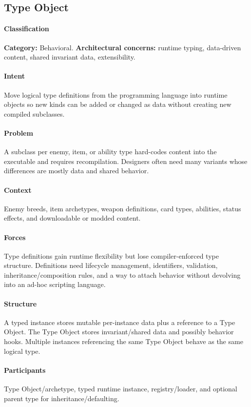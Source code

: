 \documentclass[11pt]{article}
\begin{document}
\subsection{Type Object}\label{pat:type-object}
\paragraph{Classification} \textbf{Category:} Behavioral. \textbf{Architectural concerns:} runtime typing, data-driven content, shared invariant data, extensibility.
\paragraph{Intent} Move logical type definitions from the programming language into runtime objects so new kinds can be added or changed as data without creating new compiled subclasses.
\paragraph{Problem} A subclass per enemy, item, or ability type hard-codes content into the executable and requires recompilation. Designers often need many variants whose differences are mostly data and shared behavior.
\paragraph{Context} Enemy breeds, item archetypes, weapon definitions, card types, abilities, status effects, and downloadable or modded content.
\paragraph{Forces} Type definitions gain runtime flexibility but lose compiler-enforced type structure. Definitions need lifecycle management, identifiers, validation, inheritance/composition rules, and a way to attach behavior without devolving into an ad-hoc scripting language.
\paragraph{Structure} A typed instance stores mutable per-instance data plus a reference to a Type Object. The Type Object stores invariant/shared data and possibly behavior hooks. Multiple instances referencing the same Type Object behave as the same logical type.
\paragraph{Participants} Type Object/archetype, typed runtime instance, registry/loader, and optional parent type for inheritance/defaulting.
\end{document}
